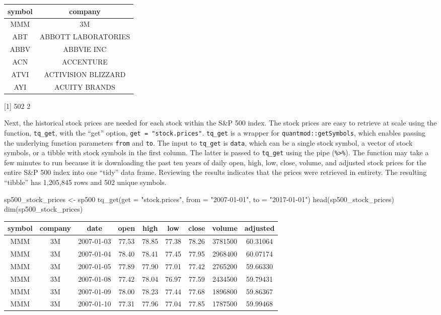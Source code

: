 \begin{tabular}{cc}
\toprule
symbol & company\\
\midrule
MMM & 3M\\
ABT & ABBOTT LABORATORIES\\
ABBV & ABBVIE INC\\
ACN & ACCENTURE\\
ATVI & ACTIVISION BLIZZARD\\
AYI & ACUITY BRANDS\\
\bottomrule
\end{tabular}

{[}1{]} 502 2

\hspace{20 mm}

Next, the historical stock prices are needed for each stock within the
S\&P 500 index. The stock prices are easy to retrieve at scale using the
function, \texttt{tq\_get}, with the ``get'' option,
\texttt{get\ =\ "stock.prices"}. \texttt{tq\_get} is a wrapper for
\texttt{quantmod::getSymbols}, which enables passing the underlying
function parameters \texttt{from} and \texttt{to}. The input to
\texttt{tq\_get} is \texttt{data}, which can be a single stock symbol, a
vector of stock symbols, or a tibble with stock symbols in the first
column. The latter is passed to \texttt{tq\_get} using the pipe
(\texttt{\%\textgreater{}\%}). The function may take a few minutes to
run because it is downloading the past ten years of daily open, high,
low, close, volume, and adjusted stock prices for the entire S\&P 500
index into one ``tidy'' data frame. Reviewing the results indicates that
the prices were retrieved in entirety. The resulting ``tibble'' has
1,205,845 rows and 502 unique symbols.

\begin{Schunk}
\begin{Sinput}
sp500_stock_prices <- sp500 %
    tq_get(get  = "stock.prices", 
           from = "2007-01-01", 
           to   = "2017-01-01")
head(sp500_stock_prices)
dim(sp500_stock_prices)
\end{Sinput}
\end{Schunk}

\begin{tabular}{ccccccccc}
\toprule
symbol & company & date & open & high & low & close & volume & adjusted\\
\midrule
MMM & 3M & 2007-01-03 & 77.53 & 78.85 & 77.38 & 78.26 & 3781500 & 60.31064\\
MMM & 3M & 2007-01-04 & 78.40 & 78.41 & 77.45 & 77.95 & 2968400 & 60.07174\\
MMM & 3M & 2007-01-05 & 77.89 & 77.90 & 77.01 & 77.42 & 2765200 & 59.66330\\
MMM & 3M & 2007-01-08 & 77.42 & 78.04 & 76.97 & 77.59 & 2434500 & 59.79431\\
MMM & 3M & 2007-01-09 & 78.00 & 78.23 & 77.44 & 77.68 & 1896800 & 59.86367\\
MMM & 3M & 2007-01-10 & 77.31 & 77.96 & 77.04 & 77.85 & 1787500 & 59.99468\\
\bottomrule
\end{tabular}

